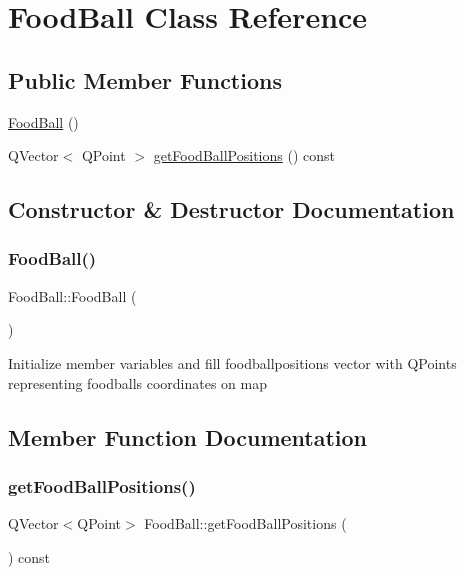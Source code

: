 \hypertarget{class_food_ball}{}\section{Food\+Ball Class Reference}
\label{class_food_ball}
\subsection*{Public Member Functions}
\begin{DoxyCompactItemize}
\item 
\mbox{\hyperlink{class_food_ball_accba761984d128bead135b3864a63ed0}{Food\+Ball}} ()
\item 
Q\+Vector$<$ Q\+Point $>$ \mbox{\hyperlink{class_food_ball_ab87f24f47ffac21ad19222b0cc746173}{get\+Food\+Ball\+Positions}} () const
\end{DoxyCompactItemize}


\subsection{Constructor \& Destructor Documentation}
\mbox{\label{class_food_ball_accba761984d128bead135b3864a63ed0}} 
\subsubsection{\texorpdfstring{Food\+Ball()}{FoodBall()}}
{\footnotesize\ttfamily Food\+Ball\+::\+Food\+Ball (\begin{DoxyParamCaption}{ }\end{DoxyParamCaption})}

Initialize member variables and fill foodballpositions vector with Q\+Points representing foodballs coordinates on map 

\subsection{Member Function Documentation}
\mbox{\label{class_food_ball_ab87f24f47ffac21ad19222b0cc746173}} 
\subsubsection{\texorpdfstring{get\+Food\+Ball\+Positions()}{getFoodBallPositions()}}
{\footnotesize\ttfamily Q\+Vector$<$Q\+Point$>$ Food\+Ball\+::get\+Food\+Ball\+Positions (\begin{DoxyParamCaption}{ }\end{DoxyParamCaption}) const\hspace{0.3cm}{\ttfamily [inline]}}

